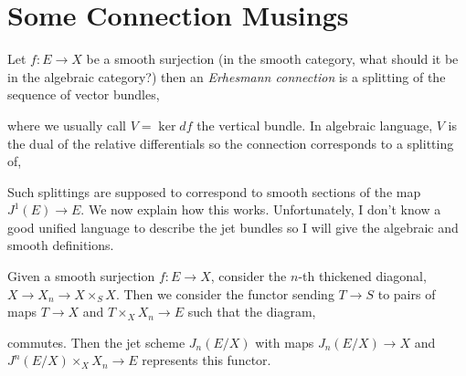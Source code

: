 \documentclass[12pt]{article}
\begin{document}
\renewcommand{\C}{\mathcal{C}}

\section{Some Connection Musings}

\begin{defn}
Let $f : E \to X$ be a smooth surjection (in the smooth category, what should it be in the algebraic category?) then an \textit{Erhesmann connection} is a  splitting of the sequence of vector bundles,
\begin{center}
\end{center}
where we usually call $V = \ker{d{f}}$ the vertical bundle. In algebraic language, $V$ is the dual of the relative differentials so the connection corresponds to a splitting of,
\begin{center}
\end{center}
\end{defn}

\begin{rmk}
Such splittings are supposed to correspond to smooth sections of the map $J^1(E) \to E$. We now explain how this works. Unfortunately, I don't know a good unified language to describe the jet bundles so I will give the algebraic and smooth definitions.
\end{rmk}

\begin{defn}
Given a smooth surjection $f : E \to X$, consider the $n$-th thickened diagonal, $X \to X_n \to X \times_S X$. Then we consider the functor sending $T \to S$ to pairs of maps $T \to X$ and $T \times_X X_n \to E$ such that the diagram,
\begin{center}
\end{center}
commutes. Then the jet scheme $J_n(E/X)$ with maps $J_n(E/X) \to X$ and $J^n(E/X) \times_X X_n \to E$ represents this functor.
\end{defn}
\end{document}
